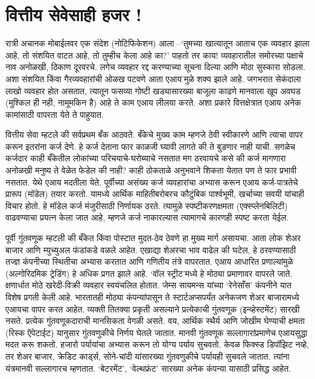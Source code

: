 \chapter{वित्तीय सेवेसाही हजर !}

रात्री अचानक मोबाईलवर एक संदेश (नोटिफिकेशन) आला –`तुमच्या खात्यातून आताच एक व्यवहार झाला आहे, तो संशयित वाटत आहे, तो तुम्हीच केला आहे का?' पाहतो तर काय! व्यवहारातील समोरच्या पक्षाचे नाव अनोळखी, ठिकाण दूरवरचे. लगेच व्यवहार रद्द करण्याच्या सूचना दिल्या आणि मोठा सुस्कारा सोडला. अशा संशयित किंवा गैरव्यवहारांची ओळख पटवणे आता एआय'मुळे शक्य झाले आहे. जगभरात सेकंदाला लाखो व्यवहार होत असतात, त्यातून फसव्या गोष्टी खड्यासारख्या बाजूला काढणे मानवाला खूप अवघड (मुश्किल ही नही, नामूमकिन है) आहे ते काम एआय लीलया करते. अशा प्रकारे वित्तक्षेत्रात एआय अनेक कामांसाठी वापरता येते ते पाहुयात.

वित्तीय सेवा म्हटले की सर्वप्रथम बँक आठवते. बँकेचे मुख्य काम म्हणजे ठेवी स्वीकारणे आणि त्याचा वापर करून इतरांना कर्ज देणे. हे कर्ज देताना फार काळजी घ्यावी लागते की ते बुडणार नाही याची. सगळेच कर्जदार काही बँकेतील लोकांच्या परिचयाचे-घरोब्याचे नसतात मग ठरवायचे कसे की कर्ज मागणारा अनोळखी मनुष्य ते वेळेत फेडेल की नाही? काही ठोकताळे अनुभवाने शिकता येतात पण ते फार प्रभावी नसतात. येथे एआय मदतीला येते. पूर्वीच्या असंख्य कर्ज व्यवहारांचा अभ्यास करून एआय कर्ज-पात्रतेचे प्रारूप (मॉडेल) तयार करतो. यामध्ये आर्थिक माहितीबरोबरच कौटुंबिक पार्श्वभूमी, खर्चाच्या सवयी यांचाही विचार होतो. हे मॉडेल कर्ज मंजुरीसाठी निर्णायक ठरते. त्यामुळे स्पष्टीकरणक्षमता (एक्स्प्लेनबिलिटी) वाढवण्याचा प्रयत्न केला जात आहे, म्हणजे कर्ज नाकारल्यास त्यामागचे कारणही स्पष्ट करता येईल.

पूर्वी गुंतवणूक म्हटली की बँकेत किंवा पोस्टात मुदत-ठेव ठेवणे हा मुख्य मार्ग असायचा. आता लोक शेअर बाजार आणि म्युच्युअल फंडांकडे वळले आहेत. एखाद्या शेअरचा भाव वाढेल की घटेल, हे ठरवण्यासाठी तज्ज्ञ कंपनीच्या स्थितीचा अभ्यास करतात आणि गणितीय तंत्रे वापरतात. एआय आधारित प्रणाल्यांमुळे (अल्गोरिदमिक ट्रेडिंग) हे अधिक प्रगत झाले आहे. `वॉल स्ट्रीट'मध्ये हे मोठ्या प्रमाणावर वापरले जाते. क्षणार्धात मोठे खरेदी-विक्री व्यवहार स्वयंचलित होतात. जेम्स सायमन्स यांच्या `रेनेसाँस' कंपनीने यात विशेष प्रगती केली आहे. भारतातही मोठ्या कंपन्यांपासून ते स्टार्टअप्सपर्यंत अनेकजण शेअर बाजारामध्ये एआयचा वापर करत आहेत. व्यक्ती तितक्या प्रकृती असल्याने प्रत्येकाची गुंतवणूक (इन्व्हेस्टमेंट) सारखी नसते. प्रत्येक गुंतवणूकदाराची मानसिकता वेगळी असते. वय, आर्थिक स्थैर्य आणि जोखीम घेण्याची क्षमता (रिस्क ऍपेटाईट) यानुसार गुंतवणुकीचे निर्णय घेतले जातात. मानवी गुंतवणूक सल्लागारांप्रमाणेच एआयसुद्धा मदत करू शकतो. हजारो पर्यायांचा अभ्यास करून तो योग्य पर्याय सुचवतो. केवळ फिक्स्ड डिपॉझिट नव्हे, तर शेअर बाजार, क्रेडिट कार्ड्स, सोने-चांदी यांसारख्या गुंतवणुकीचे पर्यायही सुचवले जातात. त्यांना यंत्रमानवी सल्लागारच म्हणतात. `बेटरमेंट', `वेल्थफ्रंट' सारख्या अनेक कंपन्या यासाठी प्रसिद्ध आहेत.

